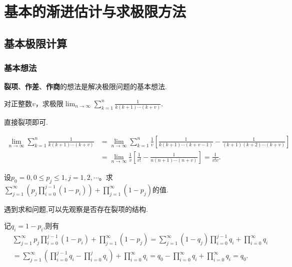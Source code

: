 \documentclass[../../main.tex]{subfiles}
\begin{document}
\section{基本的渐进估计与求极限方法}

\subsection{基本极限计算}

\subsubsection{基本想法}

\textbf{裂项}、\textbf{作差}、\textbf{作商}的想法是解决极限问题的基本想法.

\begin{example}
对正整数\(v\)，求极限\(\lim_{n\rightarrow\infty}\sum_{k = 1}^{n}\frac{1}{k(k + 1)\cdots(k + v)}\).
\end{example}
\begin{note}
直接裂项即可.
\end{note}
\begin{solution}
\begin{align*}
\lim_{n\rightarrow \infty} \sum_{k=1}^n{\frac{1}{k(k+1)\cdots (k+v)}}&=\lim_{n\rightarrow \infty} \sum_{k=1}^n{\frac{1}{v}\left[ \frac{1}{k\left( k+1 \right) \cdots \left( k+v-1 \right)}-\frac{1}{\left( k+1 \right) \left( k+2 \right) \cdots \left( k+v \right)} \right]}
\\
&=\lim_{n\rightarrow \infty} \frac{1}{v}\left[ \frac{1}{v!}-\frac{1}{n\left( n+1 \right) \cdots \left( n+v \right)} \right] =\frac{1}{v!v}.
\end{align*}
\end{solution}

\begin{example}
设\(p_0 = 0,0\leqslant  p_j\leqslant 1,j = 1,2,\cdots\)。求\(\sum_{j = 1}^{\infty}\left(p_j\prod_{i = 0}^{j - 1}(1 - p_i)\right)+\prod_{j = 1}^{\infty}(1 - p_j)\)的值.
\end{example}
\begin{note}
遇到求和问题,可以先观察是否存在裂项的结构.
\end{note}
\begin{solution}
记$q_i=1-p_i$,则有
\begin{align*}
&\sum_{j=1}^{\infty}{p_j\prod_{i=0}^{j-1}{\left( 1-p_i \right)}}+\prod_{j=1}^{\infty}{\left( 1-p_j \right)}=\sum_{j=1}^{\infty}{\left( 1-q_j \right) \prod_{i=0}^{j-1}{q_i}}+\prod_{i=0}^{\infty}{q_i}
\\
&=\sum_{j=1}^{\infty}{\left( \prod_{i=0}^{j-1}{q_i}-\prod_{i=0}^j{q_i} \right)}+\prod_{i=0}^{\infty}{q_i}=q_0-\prod_{i=0}^{\infty}{q_i}+\prod_{i=0}^{\infty}{q_i}=q_0.
\end{align*}
\end{solution}
\end{document}
